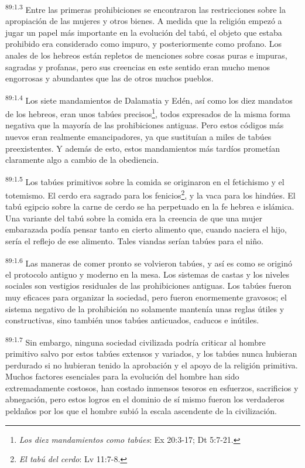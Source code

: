 \documentclass[twoside, 11pt]{book}
\begin{document}
\par
\textsuperscript{89:1.3} Entre las primeras prohibiciones se encontraron las restricciones sobre la apropiación de las mujeres y otros bienes. A medida que la religión empezó a jugar un papel más importante en la evolución del tabú, el objeto que estaba prohibido era considerado como impuro, y posteriormente como profano. Los anales de los hebreos están repletos de menciones sobre cosas puras e impuras, sagradas y profanas, pero sus creencias en este sentido eran mucho menos engorrosas y abundantes que las de otros muchos pueblos.

\par
\textsuperscript{89:1.4} Los siete mandamientos de Dalamatia y Edén, así como los diez mandatos de los hebreos, eran unos tabúes precisos\footnote{\textit{Los diez mandamientos como tabúes}: Ex 20:3-17; Dt 5:7-21.}, todos expresados de la misma forma negativa que la mayoría de las prohibiciones antiguas. Pero estos códigos más nuevos eran realmente emancipadores, ya que sustituían a miles de tabúes preexistentes. Y además de esto, estos mandamientos más tardíos prometían claramente algo a cambio de la obediencia.

\par
\textsuperscript{89:1.5} Los tabúes primitivos sobre la comida se originaron en el fetichismo y el totemismo. El cerdo era sagrado para los fenicios\footnote{\textit{El tabú del cerdo}: Lv 11:7-8.}, y la vaca para los hindúes. El tabú egipcio sobre la carne de cerdo se ha perpetuado en la fe hebrea e islámica. Una variante del tabú sobre la comida era la creencia de que una mujer embarazada podía pensar tanto en cierto alimento que, cuando naciera el hijo, sería el reflejo de ese alimento. Tales viandas serían tabúes para el niño.

\par
\textsuperscript{89:1.6} Las maneras de comer pronto se volvieron tabúes, y así es como se originó el protocolo antiguo y moderno en la mesa. Los sistemas de castas y los niveles sociales son vestigios residuales de las prohibiciones antiguas. Los tabúes fueron muy eficaces para organizar la sociedad, pero fueron enormemente gravosos; el sistema negativo de la prohibición no solamente mantenía unas reglas útiles y constructivas, sino también unos tabúes anticuados, caducos e inútiles.

\par
\textsuperscript{89:1.7} Sin embargo, ninguna sociedad civilizada podría criticar al hombre primitivo salvo por estos tabúes extensos y variados, y los tabúes nunca hubieran perdurado si no hubieran tenido la aprobación y el apoyo de la religión primitiva. Muchos factores esenciales para la evolución del hombre han sido extremadamente costosos, han costado inmensos tesoros en esfuerzos, sacrificios y abnegación, pero estos logros en el dominio de sí mismo fueron los verdaderos peldaños por los que el hombre subió la escala ascendente de la civilización.
\end{document}
